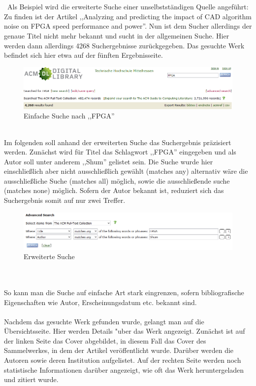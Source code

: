 \documentclass[
	ngerman,
	parskip=half,
	headsepline,
	fontsize=12pt,
	DIV=13,
	listof=leveldown,
	]{scrreprt}
\begin{document}
\\\
\\\
Als Beispiel wird die erweiterte Suche einer unselbstständigen Quelle angeführt: Zu finden ist der Artikel ,,Analyzing and predicting the impact of CAD algorithm noise on FPGA speed performance and power''. Nun ist dem Sucher allerdings der genaue Titel nicht mehr bekannt und sucht in der allgemeinen Suche. Hier werden dann allerdings 4268 Suchergebnisse zurückgegeben. Das gesuchte Werk befindet sich hier etwa auf der fünften Ergebnisseite. 
\begin{figure}[ht]
\centering
\includegraphics[width=\textwidth]{img/Suche_FPGA.PNG}
\caption{Einfache Suche nach ,,FPGA'' {\cite{image:lookupfpga}}}
\end{figure}
\ \\
Im folgenden soll anhand der erweiterten Suche das Suchergebnis präzisiert werden. Zunächst wird für Titel das Schlagwort ,,FPGA'' eingegeben und als Autor soll unter anderem ,,Shum'' gelistet sein.
Die Suche wurde hier einschließlich aber nicht ausschließlich gewählt (matches any) alternativ wäre die ausschließliche Suche (matches all) möglich, sowie die ausschließende suche (matches none) möglich.
Sofern der Autor bekannt ist, reduziert sich das Suchergebnis somit auf nur zwei Treffer.
\ \\
\begin{figure}[ht]
\centering
\includegraphics[width=\textwidth]{img/Suche_FPGA-Shum.PNG}
\caption{Erweiterte Suche {\cite{image:lookupfpgashum}}}
\end{figure}
\ \\
\ \\
So kann man die Suche auf einfache Art stark eingrenzen, sofern bibliografische Eigenschaften wie Autor, Erscheinungsdatum etc. bekannt sind.
\ \\
\ \\
Nachdem das gesuchte Werk gefunden wurde, gelangt man auf die Übersichtsseite. Hier werden Details "uber das Werk angezeigt. Zunächst ist auf der linken Seite das Cover abgebildet, in diesem Fall das Cover des Sammelwerkes, in dem der Artikel veröffentlicht wurde. Darüber werden die Autoren sowie deren Institution aufgelistet. Auf der rechten Seite werden noch statistische Informationen darüber angezeigt, wie oft das Werk heruntergeladen und zitiert wurde.
\end{document}
